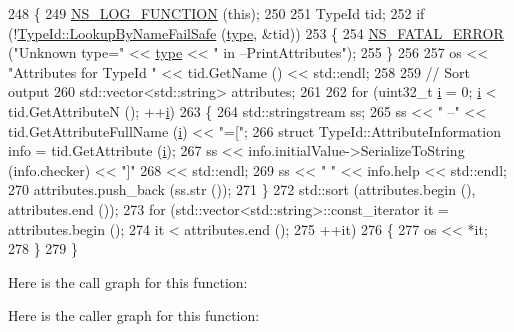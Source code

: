 \begin{DoxyCode}
248 \{
249   \hyperlink{log-macros-disabled_8h_a90b90d5bad1f39cb1b64923ea94c0761}{NS\_LOG\_FUNCTION} (\textcolor{keyword}{this});
250 
251   TypeId tid;
252   \textcolor{keywordflow}{if} (!\hyperlink{classns3_1_1TypeId_acceab1f57bfe3c3af02130277d409f14}{TypeId::LookupByNameFailSafe} (\hyperlink{visualizer-ideas_8txt_add98db9e15e2a58cf2b57623e7aa893a}{type}, &tid))
253     \{
254       \hyperlink{group__fatal_ga5131d5e3f75d7d4cbfd706ac456fdc85}{NS\_FATAL\_ERROR} (\textcolor{stringliteral}{"Unknown type="} << \hyperlink{visualizer-ideas_8txt_add98db9e15e2a58cf2b57623e7aa893a}{type} << \textcolor{stringliteral}{" in --PrintAttributes"});
255     \}
256 
257   os << \textcolor{stringliteral}{"Attributes for TypeId "} << tid.GetName () << std::endl;
258   
259   \textcolor{comment}{// Sort output}
260   std::vector<std::string> attributes;
261   
262   \textcolor{keywordflow}{for} (uint32\_t \hyperlink{bernuolliDistribution_8m_a6f6ccfcf58b31cb6412107d9d5281426}{i} = 0; \hyperlink{bernuolliDistribution_8m_a6f6ccfcf58b31cb6412107d9d5281426}{i} < tid.GetAttributeN (); ++\hyperlink{bernuolliDistribution_8m_a6f6ccfcf58b31cb6412107d9d5281426}{i})
263     \{
264       std::stringstream ss;
265       ss << \textcolor{stringliteral}{"    --"} << tid.GetAttributeFullName (\hyperlink{bernuolliDistribution_8m_a6f6ccfcf58b31cb6412107d9d5281426}{i}) << \textcolor{stringliteral}{"=["};
266       \textcolor{keyword}{struct }TypeId::AttributeInformation info = tid.GetAttribute (\hyperlink{bernuolliDistribution_8m_a6f6ccfcf58b31cb6412107d9d5281426}{i});
267       ss << info.initialValue->SerializeToString (info.checker) << \textcolor{stringliteral}{"]"}
268                 << std::endl;
269       ss << \textcolor{stringliteral}{"        "} << info.help << std::endl;
270       attributes.push\_back (ss.str ());
271     \}
272   std::sort (attributes.begin (), attributes.end ());
273   \textcolor{keywordflow}{for} (std::vector<std::string>::const\_iterator it = attributes.begin ();
274        it < attributes.end ();
275        ++it)
276     \{
277       os << *it;
278     \}
279 \}
\end{DoxyCode}


Here is the call graph for this function\+:




Here is the caller graph for this function\+:


